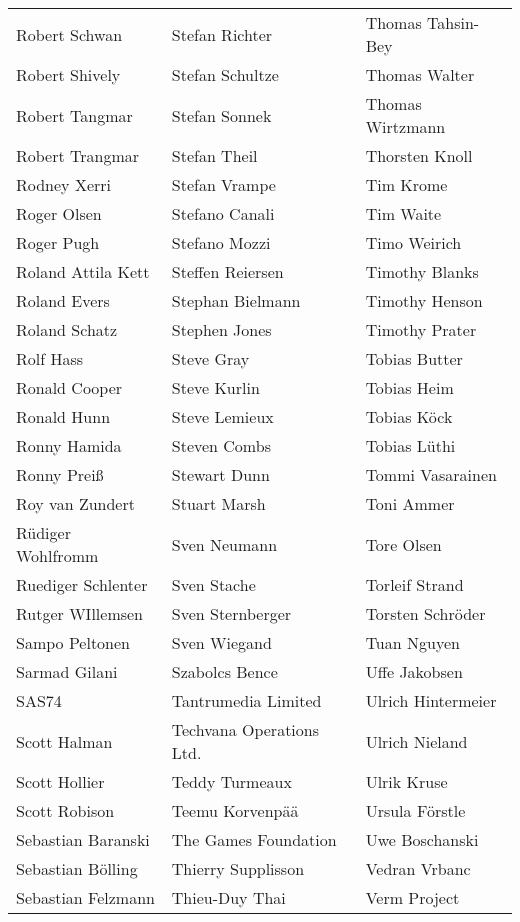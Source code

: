\begin{tabular}{p{4.5cm}p{4.5cm}p{4.5cm}}
Robert Schwan & Stefan Richter & Thomas Tahsin-Bey \\
Robert Shively & Stefan Schultze & Thomas Walter \\
Robert Tangmar & Stefan Sonnek & Thomas Wirtzmann \\
Robert Trangmar & Stefan Theil & Thorsten Knoll \\
Rodney Xerri & Stefan Vrampe & Tim Krome \\
Roger Olsen & Stefano Canali & Tim Waite \\
Roger Pugh & Stefano Mozzi & Timo Weirich \\
Roland Attila Kett & Steffen Reiersen & Timothy Blanks \\
Roland Evers & Stephan Bielmann & Timothy Henson \\
Roland Schatz & Stephen Jones & Timothy Prater \\
Rolf Hass & Steve Gray & Tobias Butter \\
Ronald Cooper & Steve Kurlin & Tobias Heim \\
Ronald Hunn & Steve Lemieux & Tobias Köck \\
Ronny Hamida & Steven Combs & Tobias Lüthi \\
Ronny Preiß & Stewart Dunn & Tommi Vasarainen \\
Roy van Zundert & Stuart Marsh & Toni Ammer \\
Rüdiger Wohlfromm & Sven Neumann & Tore Olsen \\
Ruediger Schlenter & Sven Stache & Torleif Strand \\
Rutger WIllemsen & Sven Sternberger & Torsten Schröder \\
Sampo Peltonen & Sven Wiegand & Tuan Nguyen \\
Sarmad Gilani & Szabolcs Bence & Uffe Jakobsen \\
SAS74 & Tantrumedia Limited & Ulrich Hintermeier \\
Scott Halman & Techvana Operations Ltd. & Ulrich Nieland \\
Scott Hollier & Teddy Turmeaux & Ulrik Kruse \\
Scott Robison & Teemu Korvenpää & Ursula Förstle \\
Sebastian Baranski & The Games Foundation & Uwe Boschanski \\
Sebastian Bölling & Thierry Supplisson & Vedran Vrbanc \\
Sebastian Felzmann & Thieu-Duy Thai & Verm Project \\

\end{tabular}
